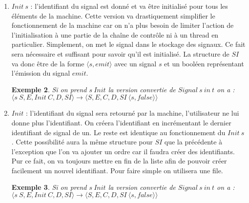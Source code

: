 \documentclass[10pt,a4paper]{report}
\newtheorem{ex}{Exemple}
\begin{document}
\begin{enumerate}
\begin{enumerate}
			\begin{ex}
				Si on prend $\langle s,C'\rangle$ la version convertie de $Signal~s~in~t$ on a : 
				\\$\langle S,E,\langle s,C'\rangle C,D,SI\rangle \longrightarrow \langle \emptyset,\emptyset,C',\langle s,\langle S,E,C,D\rangle\rangle,SI~\langle s,true,false\rangle \rangle$ 
			\end{ex}
			
			Cette version est assez efficace mais reste lourde dans la machine au niveau du stockage et la façon dont cette commande est convertie crée le même problème que pour la première version du $Spawn$:  on n'est pas censé avoir de structure à traiter dans la machine.
		\end{enumerate}
		
		\item $Init~s$ : l'identifiant du signal est donné et va être initialisé pour tous les éléments de la machine. Cette version va drastiquement simplifier le fonctionnement de la machine car on n'a plus besoin de limiter l'action de l'initialisation à une partie de la chaîne de contrôle ni à un thread en particulier. Simplement, on met le signal dans le stockage des signaux. Ce fait sera nécessaire et suffisant pour savoir qu'il est initialisé. La structure de $SI$ va donc être de la forme $\langle s,emit\rangle$ avec un signal $s$ et un booléen représentant l'émission du signal $emit$.
		
		\begin{ex}
			 Si on prend $s~Init$ la version convertie de $Signal~s~in~t$ on a : 
			\\$\langle s~S,E,Init~C,D,SI\rangle \longrightarrow \langle S,E,C,D,SI~\langle s,false\rangle \rangle$ 
		\end{ex}
		
		\item $Init$ : l'identifiant du signal sera retourné par la machine, l'utilisateur ne lui donne plus l'identifiant. On créera l'identifiant en incrémentant le dernier identifiant de signal de un. Le reste est identique au fonctionnement du $Init~s$. Cette possibilité aura la même structure pour $SI$ que la précédente à l'exception que l'on va ajouter un ordre car il faudra créer des identifiants. Pur ce fait, on va toujours mettre en fin de la liste afin de pouvoir créer facilement un nouvel identifiant. Pour faire simple on utilisera une file.
		
		\begin{ex}
			 Si on prend $s~Init$ la version convertie de $Signal~s~in~t$ on a : 
			\\$\langle s~S,E,Init~C,D,SI\rangle \longrightarrow \langle S,E,C,D,SI~\langle s,false\rangle \rangle$ 
		\end{ex}
		
	\end{enumerate}
	\bigbreak
	
\end{document}
